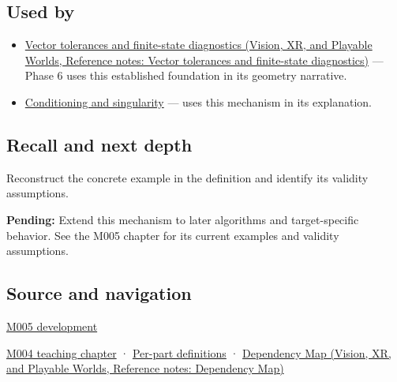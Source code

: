 \subsection{Used by}\label{appendix-0ec599f8ba27-used-by}

\begin{itemize}
\item
  \href{../07-Vision-XR-and-Playable-Worlds/main.pdf\#nameddest=appendix-b5b83329215b}{Vector tolerances and finite-state diagnostics (Vision, XR, and Playable Worlds, Reference notes: Vector tolerances and finite-state diagnostics)} --- Phase 6 uses this established foundation in its geometry narrative.
\item
  \hyperref[appendix-8f6a01f284a7]{Conditioning and singularity} --- uses this mechanism in its explanation.
\end{itemize}

\subsection{Recall and next depth}\label{appendix-0ec599f8ba27-recall-and-next-depth}

Reconstruct the concrete example in the definition and identify its validity assumptions.

\textbf{Pending:} Extend this mechanism to later algorithms and target-specific behavior. See the M005 chapter for its current examples and validity assumptions.

\subsection{Source and navigation}\label{appendix-0ec599f8ba27-source-and-navigation}

\hyperref[01-foundations-i-ch001-when-arithmetic-meets-uncertainty]{M005 development}

\hyperref[01-foundations-i-ch001-a-stretching-ruler-for-real-valued-quantities]{M004 teaching chapter} · \hyperref[appendix-fd090d982a15-m004---parts-61-76]{Per-part definitions} · \href{../07-Vision-XR-and-Playable-Worlds/main.pdf\#nameddest=appendix-4ad47bdd269a}{Dependency Map (Vision, XR, and Playable Worlds, Reference notes: Dependency Map)}
